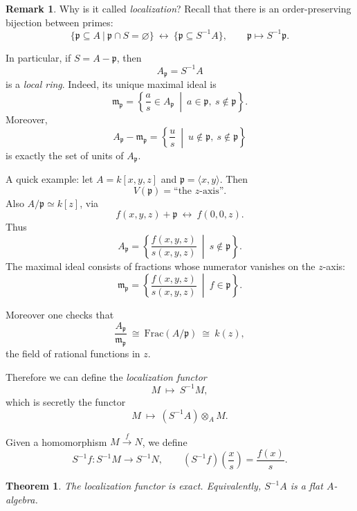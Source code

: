 \documentclass[11pt,a4paper]{article}
\theoremstyle{definition}
\newtheorem{remark}[definition]{Remark}
\theoremstyle{plain}
\newtheorem{theorem}[definition]{Theorem}
\theoremstyle{remark}
\begin{document}
\begin{remark}
    Why is it called \emph{localization}? Recall that there is an order-preserving bijection between primes:
    \[
    \Big\{\mathfrak p\subseteq A \ \big|\ \mathfrak p\cap S=\varnothing\Big\}
    \ \longleftrightarrow\
    \Big\{\mathfrak p \subseteq S^{-1}A\Big\},
    \qquad 
    \mathfrak p\mapsto S^{-1}\mathfrak p.
    \]

    In particular, if $S=A-\mathfrak p$, then
    \[
    A_{\mathfrak p}=S^{-1}A
    \]
    is a \emph{local ring}. Indeed, its unique maximal ideal is
    \[
    \mathfrak m_{\mathfrak p}
    =
    \left\{\frac{a}{s}\in A_{\mathfrak p}\ \middle|\ a\in\mathfrak p,\ s\notin\mathfrak p\right\}.
    \]
    Moreover,
    \[
    A_{\mathfrak p}-\mathfrak m_{\mathfrak p}
    =
    \left\{\frac{u}{s}\ \middle|\ u\notin\mathfrak p,\ s\notin\mathfrak p\right\}
    \]
    is exactly the set of units of $A_{\mathfrak p}$.

    \medskip

    A quick example: let $A=k[x,y,z]$ and $\mathfrak p=\langle x,y\rangle$. Then
    \[
    V(\mathfrak p)=\text{``the $z$-axis''}.
    \]
    Also $A/\mathfrak p\simeq k[z]$, via
    \[
    f(x,y,z)+\mathfrak p \ \longleftrightarrow\ f(0,0,z).
    \]
    Thus
    \[
    A_{\mathfrak p}
    =
    \left\{\frac{f(x,y,z)}{s(x,y,z)}\ \middle|\ s\notin\mathfrak p\right\}.
    \]
    The maximal ideal consists of fractions whose numerator vanishes on the $z$-axis:
    \[
    \mathfrak m_{\mathfrak p}
    =
    \left\{\frac{f(x,y,z)}{s(x,y,z)}\ \middle|\ f\in\mathfrak p\right\}.
    \]

    Moreover one checks that
    \[
    \frac{A_{\mathfrak p}}{\mathfrak m_{\mathfrak p}}
    \ \cong\
    \mathrm{Frac}(A/\mathfrak p)
    \ \cong\ k(z),
    \]
    the field of rational functions in $z$.
\end{remark}


Therefore we can define the \emph{localization functor}
\[
M\ \longmapsto\ S^{-1}M,
\]
which is secretly the functor
\[
M\ \longmapsto\ (S^{-1}A)\otimes_A M.
\]

Given a homomorphism $M\xrightarrow{f}N$, we define
\[
S^{-1}f:S^{-1}M\to S^{-1}N,
\qquad 
(S^{-1}f)\!\left(\frac{x}{s}\right)=\frac{f(x)}{s}.
\]

\begin{theorem}
    The localization functor is exact. Equivalently, $S^{-1}A$ is a flat $A$-algebra.
\end{theorem}
\end{document}
